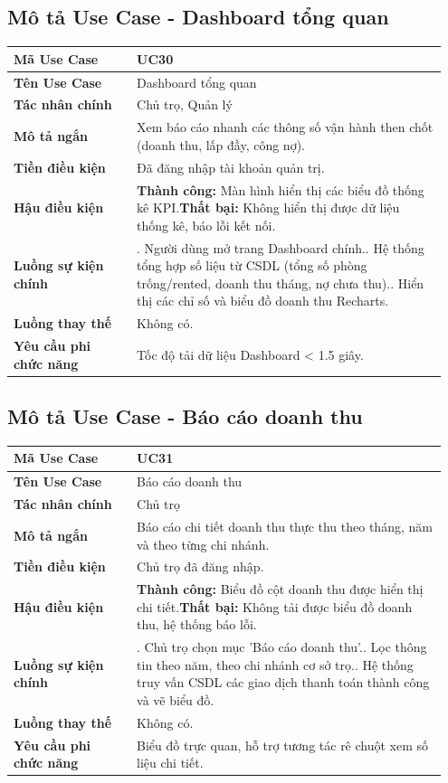 \documentclass[a4paper,oneside]{report}
\begin{document}
\subsection{Mô tả Use Case - Dashboard tổng quan}

\begin{longtable}[]{@{}>{\RaggedRight\arraybackslash}p{0.27\linewidth}>{\RaggedRight\arraybackslash}p{0.68\linewidth}@{}}
\toprule
\textbf{Mã Use Case} & UC30\tabularnewline
\midrule
\endhead
\textbf{Tên Use Case} & Dashboard tổng quan\tabularnewline
\textbf{Tác nhân chính} & Chủ trọ, Quản lý\tabularnewline
\textbf{Mô tả ngắn} & Xem báo cáo nhanh các thông số vận hành then chốt
(doanh thu, lấp đầy, công nợ).\tabularnewline
\textbf{Tiền điều kiện} & Đã đăng nhập tài khoản quản
trị.\tabularnewline
\textbf{Hậu điều kiện} & \textbf{Thành công:} Màn hình hiển thị các biểu đồ thống kê KPI.\newline \textbf{Thất bại:} Không hiển thị được dữ liệu thống kê, báo lỗi kết nối.\tabularnewline
\textbf{Luồng sự kiện chính} & 1. Người dùng mở trang
Dashboard chính.\newline 2. Hệ thống tổng hợp số liệu từ CSDL (tổng
số phòng trống/rented, doanh thu tháng, nợ chưa thu).\newline 3.
Hiển thị các chỉ số và biểu đồ doanh thu Recharts.\tabularnewline
\textbf{Luồng thay thế} & Không có.\tabularnewline
\textbf{Yêu cầu phi chức năng} & Tốc độ tải dữ liệu Dashboard
\textless{} 1.5 giây.\tabularnewline
\bottomrule
\end{longtable}

\subsection{Mô tả Use Case - Báo cáo doanh thu}

\begin{longtable}[]{@{}>{\RaggedRight\arraybackslash}p{0.27\linewidth}>{\RaggedRight\arraybackslash}p{0.68\linewidth}@{}}
\toprule
\textbf{Mã Use Case} & UC31\tabularnewline
\midrule
\endhead
\textbf{Tên Use Case} & Báo cáo doanh thu\tabularnewline
\textbf{Tác nhân chính} & Chủ trọ\tabularnewline
\textbf{Mô tả ngắn} & Báo cáo chi tiết doanh thu thực thu theo tháng,
năm và theo từng chi nhánh.\tabularnewline
\textbf{Tiền điều kiện} & Chủ trọ đã đăng nhập.\tabularnewline
\textbf{Hậu điều kiện} & \textbf{Thành công:} Biểu đồ cột doanh thu được hiển thị chi tiết.\newline \textbf{Thất bại:} Không tải được biểu đồ doanh thu, hệ thống báo lỗi.\tabularnewline
\textbf{Luồng sự kiện chính} & 1. Chủ trọ chọn mục
'Báo cáo doanh thu'.\newline 2. Lọc thông tin theo năm, theo chi
nhánh cơ sở trọ.\newline 3. Hệ thống truy vấn CSDL các giao dịch
thanh toán thành công và vẽ biểu đồ.\tabularnewline
\textbf{Luồng thay thế} & Không có.\tabularnewline
\textbf{Yêu cầu phi chức năng} & Biểu đồ trực quan, hỗ trợ tương tác rê
chuột xem số liệu chi tiết.\tabularnewline
\bottomrule
\end{longtable}
\end{document}
